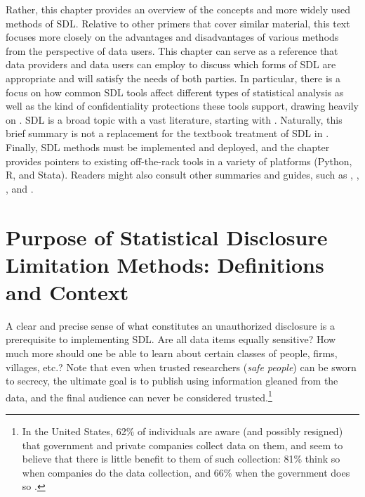 Rather, this chapter provides an overview of the concepts and more widely used methods of SDL. Relative to other primers that cover similar material, this text focuses more closely on the advantages and disadvantages of various methods from the perspective of data users. This chapter can serve as a reference that data providers and data users can employ to discuss which forms of SDL are appropriate and will satisfy the needs of both parties. In particular, there is a focus on how common SDL tools affect different types of statistical analysis as well as the kind of confidentiality protections these tools support, drawing heavily on \citet{abowd_economic_2015}. SDL is a broad topic with a vast literature, starting with \citet{fellegi_question_1972}. Naturally, this brief summary is not a replacement for the textbook treatment of SDL in \citet{duncan_statistical_2011}. Finally, SDL methods must be implemented and deployed, and the chapter provides pointers to existing off-the-rack tools in a variety of platforms (Python, R, and Stata). Readers might also consult other summaries and guides, such as \citet{dupriez_dissemination_2010}, \citet{world_bank_dime_nodate}, \citet{kopper_j-pal_2020}, and \citet{liu_statistical_2020}.

\newpage

\hypertarget{purpose-of-statistical-disclosure-limitation-methods-definitions-and-context}{%
\section{Purpose of Statistical Disclosure Limitation Methods: Definitions and Context}\label{purpose-of-statistical-disclosure-limitation-methods-definitions-and-context}}

A clear and precise sense of what constitutes an unauthorized disclosure is a prerequisite to implementing SDL. Are all data items equally sensitive? How much more should one be able to learn about certain classes of people, firms, villages, etc.? Note that even when trusted researchers (\emph{safe people}) can be sworn to secrecy, the ultimate goal is to publish using information gleaned from the data, and the final audience can never be considered trusted.\footnote{In the United States, 62\% of individuals are aware (and possibly resigned) that government and private companies collect data on them, and seem to believe that there is little benefit to them of such collection: 81\% think so when companies do the data collection, and 66\% when the government does so \citep{auxier_americans_2019}.}

